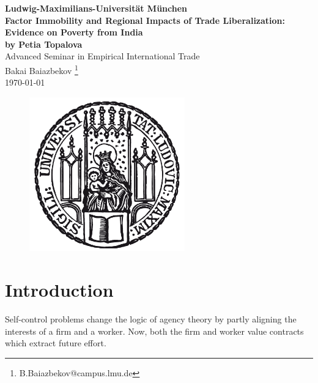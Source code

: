 \documentclass[a4paper,12pt]{article}
\begin{document}
\begin{titlepage}
\begin{center}
		{\Large \textbf{Ludwig-Maximilians-Universität München}} \\
	\vspace{35mm}
{\bfseries\LARGE{Factor Immobility and Regional Impacts of Trade Liberalization: Evidence on Poverty from India}} \\{\bfseries\large{by Petia Topalova}} 
			\vspace{10mm}\\
            {\Large Advanced Seminar in Empirical International Trade } \\
			\vspace{2mm}
            {\Large{Bakai Baiazbekov
		\renewcommand\thefootnote{*}\footnote{B.Baiazbekov@campus.lmu.de}}}\\
        {\today}	\\
		\vspace{8mm}
		\begin{figure}[h] 
        \begin{center}
\includegraphics[width=0.6\textwidth]{lmu_siegel.png} \
\end{center}
\end{figure}%
	\end{center}

\end{titlepage}


\setcounter{page}{2}
\tableofcontents  
\newpage



\setcounter{page}{1}

\section{Introduction}
Self-control problems change the logic of agency theory by partly aligning the interests of a firm and a worker. Now, both the firm and worker value contracts which extract future effort. 
\end{document}
